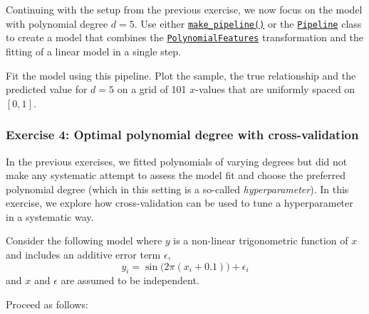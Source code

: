 \documentclass{scrartcl}
\begin{document}
Continuing with the setup from the previous exercise, we now focus on
the model with polynomial degree \(d=5\). Use either
\href{https://scikit-learn.org/stable/modules/generated/sklearn.pipeline.make_pipeline.html}{\texttt{make\_pipeline()}}
or the
\href{https://scikit-learn.org/stable/modules/generated/sklearn.pipeline.Pipeline.html}{\texttt{Pipeline}}
class to create a model that combines the
\href{https://scikit-learn.org/stable/modules/generated/sklearn.preprocessing.PolynomialFeatures.html}{\texttt{PolynomialFeatures}}
transformation and the fitting of a linear model in a single step.

Fit the model using this pipeline. Plot the sample, the true
relationship and the predicted value for \(d=5\) on a grid of 101
\(x\)-values that are uniformly spaced on \([0, 1]\).

    \hypertarget{exercise-4-optimal-polynomial-degree-with-cross-validation}{%
\subsubsection*{Exercise 4: Optimal polynomial degree with
cross-validation}\label{exercise-4-optimal-polynomial-degree-with-cross-validation}}

In the previous exercises, we fitted polynomials of varying degrees but
did not make any systematic attempt to assess the model fit and choose
the preferred polynomial degree (which in this setting is a so-called
\emph{hyperparameter}). In this exercise, we explore how
cross-validation can be used to tune a hyperparameter in a systematic
way.

Consider the following model where \(y\) is a non-linear trigonometric
function of \(x\) and includes an additive error term \(\epsilon\), \[
y_i = \sin\bigl(2 \pi (x_i + 0.1) \bigr) + \epsilon_i
\] and \(x\) and \(\epsilon\) are assumed to be independent.

Proceed as follows:
\end{document}

